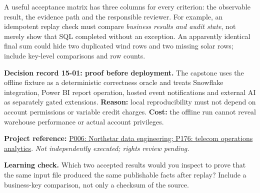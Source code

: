 \documentclass[11pt,twoside]{article}
\newcommand{\repo}[2]{\par\begingroup\fontsize{8.0}{9.6}\selectfont\sffamily\color{inkgray}\textbf{Project reference:} \href{#2}{#1}. \textit{Not independently executed; rights review pending.}\par\endgroup}
\begin{document}
A useful acceptance matrix has three columns for every criterion: the observable result, the evidence path and the responsible reviewer. For example, an idempotent replay check must compare \emph{business results and audit state}, not merely show that SQL completed without an exception. An apparently identical final sum could hide two duplicated wind rows and two missing solar rows; include key-level comparisons and row counts.
\begin{whitebox}\textbf{Decision record 15-01: proof before deployment.} The capstone uses the offline fixture as a deterministic correctness oracle and treats Snowflake integration, Power BI report operation, hosted event notifications and external AI as separately gated extensions. \textbf{Reason:} local reproducibility must not depend on account permissions or variable credit charges. \textbf{Cost:} the offline run cannot reveal warehouse performance or actual account privileges.\end{whitebox}
\repo{P006: Northstar data engineering; P176: telecom operations analytics}{https://github.com/Snowflake-Labs/sfguide-snowflake-northstar-data-engineering}
\textbf{Learning check.} Which two accepted results would you inspect to prove that the same input file produced the same publishable facts after replay? Include a business-key comparison, not only a checksum of the source.

\newpage

\end{document}
